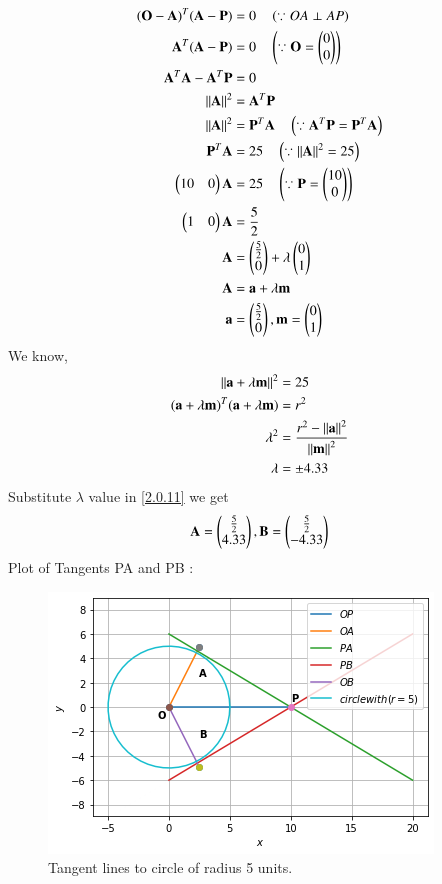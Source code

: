 \documentclass[journal,12pt,twocolumn]{IEEEtran}
\begin{document}
\begin{align}
(\mathbf{O}-\mathbf{A})^T (\mathbf{A}-\mathbf{P}) &= 0 \quad \left(\because OA \perp AP \right)
\\
\mathbf{A}^T(\mathbf{A}-\mathbf{P}) &= 0 \quad \left(\because \mathbf{O}=\begin{pmatrix}0\\0\end{pmatrix}\right)
\\
\mathbf{A}^T \mathbf{A} - \mathbf{A}^T \mathbf{P} &= 0  
\\
\left\lVert\mathbf{A}\right\rVert^2 &= \mathbf{A}^T \mathbf{P}
\\
\left\lVert\mathbf{A}\right\rVert^2 &= \mathbf{P}^T \mathbf{A}  \quad \left(\because \mathbf{A}^T \mathbf{P} = \mathbf{P}^T \mathbf{A}\right)
\\
\mathbf{P}^T \mathbf{A} &= 25 \quad \left(\because \left\lVert\mathbf{A}\right\rVert^2 = 25\right)
\\
\begin{pmatrix}10&0\end{pmatrix} \mathbf{A} &= 25 \quad \left(\because \mathbf{P} = \begin{pmatrix}10\\0\end{pmatrix} \right)
\\
\begin{pmatrix}1&0\end{pmatrix} \mathbf{A} &= \frac{5}{2}
\\
\mathbf{A} &= \begin{pmatrix}\frac{5}{2}\\0\end{pmatrix} + \lambda \begin{pmatrix}0\\1\end{pmatrix} \label{2.0.11} 
\\
\mathbf{A}&=\mathbf{a}+\lambda\mathbf{m} 
\\
\mathbf{a}&=\begin{pmatrix}\frac{5}{2}\\ 0\end{pmatrix},\mathbf{m}=\begin{pmatrix}0\\1\end{pmatrix}
\end{align}
We know,
\begin{align}
\left\lVert\mathbf{a}+\lambda\mathbf{m}\right\rVert^2&=25
\\
(\mathbf{a}+\lambda \mathbf{m})^T(\mathbf{a}+\lambda \mathbf{m})&=r^2
\\
\lambda^2&=\frac{r^2-\left\lVert\mathbf{a}\right\rVert^2}{\left\lVert\mathbf{m}\right\rVert^2}
\\
\lambda &= \pm 4.33
\end{align}
Substitute $\lambda$  value in \eqref{2.0.11} we get
\begin{align}
\mathbf{A}=\begin{pmatrix}\frac{5}{2}\\4.33\end{pmatrix},
\mathbf{B}=\begin{pmatrix}\frac{5}{2}\\-4.33\end{pmatrix}
\end{align}
Plot of Tangents PA and PB :
\begin{figure}[ht]
    \centering
    \includegraphics[width=\columnwidth]{TANGENT.png}
    \caption{Tangent lines to circle of radius 5 units.}
    \label{fig:Tangent lines to circle of radius 5 units.}
\end{figure}    
\end{document}
